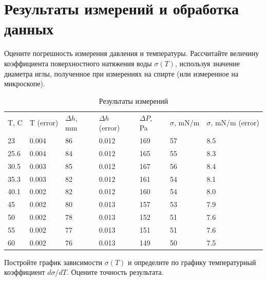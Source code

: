 \documentclass[a4paper,12pt]{article} %
\begin{document}
\section{Результаты измерений и обработка данных}

Оцените погрешность измерения давления и температуры. Рассчитайте величину
коэффициента поверхностного натяжения воды $ \sigma (T) $, используя значение диаметра иглы,
полученное при измерениях на спирте (или измеренное на микроскопе).

\begin{table}[H]
	\caption{Результаты измерений}
	\label{table:main}
\begin{tabular}{lllllll}
T, C & T (error)           & $\Delta h $, mm & $ \Delta h $ (error) & $ \Delta P $, Pa & $ \sigma $, mN/m & $ \sigma $, mN/m (error) \\
23   & 0.004 & 86                          & 0.012              & 169      & 57     & 8.5     \\
25.6 & 0.004          & 84                          & 0.012              & 165      & 55     & 8.3     \\
30.5 & 0.003 & 85                          & 0.012              & 167       & 56     & 8.4     \\
35.3 & 0.003  & 82                          & 0.012              & 161      & 54     & 8.1      \\
40.1 & 0.002 & 82                        & 0.012              & 160     & 54    & 8.0     \\
45   & 0.002 & 80                          & 0.013                          & 157       & 53      & 7.9     \\
50   & 0.002               & 78                        & 0.013              & 152     & 51    & 7.6     \\
55   & 0.002 & 77                          & 0.013               & 151      & 51     & 7.6     \\
60   & 0.002 & 76                          & 0.013              & 149      & 50     & 7.5    
\end{tabular}
\end{table}

Постройте график зависимости $ \sigma (T) $ и определите по графику температурный
коэффициент $ d \sigma / dT $. Оцените точность результата.
\end{document}
